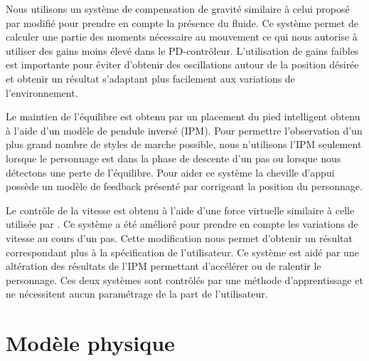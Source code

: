 \documentclass[runningheads,a4paper]{llncs}
\begin{document}
Nous utilisons un système de compensation de gravité similaire à celui proposé par \cite{coros2010generalized} modifié pour prendre en compte la présence du fluide. Ce système permet de calculer une partie des moments nécessaire au mouvement ce qui nous autorise à utiliser des gains moins élevé dans le PD-contrôleur. L'utilisation de gains faibles est importante pour éviter d'obtenir des oscillations autour de la position désirée et obtenir un résultat s'adaptant plus facilement aux variations de l'environnement.

Le maintien de l'équilibre est obtenu par un placement du pied intelligent obtenu à l'aide d'un modèle de pendule inversé (IPM). Pour permettre l'observation d'un plus grand nombre de styles de marche possible, nous n'utilisons l'IPM seulement lorsque le personnage est dans la phase de descente d'un pas ou lorsque nous détectons une perte de l'équilibre. Pour aider ce système la cheville d'appui possède un modèle de feedback présenté par \cite{yin2007simbicon} corrigeant la position du personnage.

Le contrôle de la vitesse est obtenu à l'aide d'une force virtuelle similaire à celle utilisée par \cite{coros2010generalized}. Ce système a été amélioré pour prendre en compte les variations de vitesse au cours d'un pas. Cette modification nous permet d'obtenir un résultat correspondant plus à la spécification de l'utilisateur. Ce système est aidé par une altération des résultats de l'IPM permettant d'accélérer ou de ralentir le personnage. Ces deux systèmes sont contrôlés par une méthode d'apprentissage et ne nécessitent aucun paramétrage de la part de l'utilisateur.

%
\section{Modèle physique}
\label{sec:model_physique}
\end{document}
